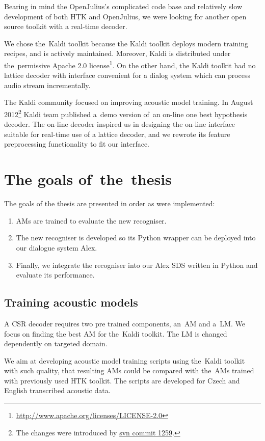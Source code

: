 Bearing in mind the OpenJulius's complicated code base and relatively slow development of both \ac{HTK} and OpenJulius, we were looking for another open source toolkit with a real-time decoder.

We chose the~Kaldi toolkit because the Kaldi toolkit deploys modern training recipes, and is actively maintained. 
Moreover, Kaldi is distributed under the~permissive Apache 2.0 license\footnote{\url{http://www.apache.org/licenses/LICENSE-2.0}}.
On the other hand, the Kaldi toolkit had no lattice decoder with interface convenient for a dialog system which can process audio stream incrementally.

The Kaldi community focused on improving acoustic model training. 
In August 2012\footnote{The changes were introduced by \href{https://sourceforge.net/p/kaldi/code/1259/}{svn commit 1259}.} Kaldi team published a~demo version of~an on-line one best hypothesis decoder.
The on-line decoder inspired us in designing the on-line interface suitable for real-time use of a lattice decoder, and we rewrote its feature preprocessing functionality to fit our interface.

\section{The goals of~the~thesis} 
\label{sec:goals}
The goals of the thesis are presented in order as were implemented:
\begin{enumerate}
    \item \acp{AM} are trained to evaluate the new recogniser.
    \item The new recogniser is developed so its Python wrapper can be deployed into our dialogue system Alex.
    \item Finally, we integrate the recogniser into our Alex \ac{SDS} written in Python and evaluate its performance.
\end{enumerate}

\subsection{Training acoustic models} 
\label{sub:training_kaldi_acoustic_models}
A \acl{CSR} decoder requires two pre trained components, an~\acl{AM} and a~\acl{LM}. 
We focus on finding the best \acl{AM} for the~Kaldi toolkit. 
The \acl{LM} is changed dependently on targeted domain.

We aim at developing acoustic model training scripts using the~Kaldi toolkit with such quality, that resulting \acp{AM} could be compared with the~\acp{AM} trained with previously used \ac{HTK} toolkit. 
The scripts are developed for Czech and English transcribed acoustic data.


